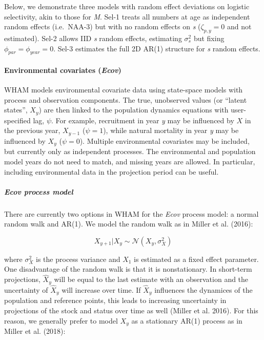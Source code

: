 \documentclass[]{article}
\let\oldparagraph\paragraph
\renewcommand{\paragraph}[1]{\oldparagraph{#1}\mbox{}}
\let\oldsubparagraph\subparagraph
\renewcommand{\subparagraph}[1]{\oldsubparagraph{#1}\mbox{}}
\begin{document}
Below, we demonstrate three models with random effect deviations on
logistic selectivity, akin to those for \emph{M}. Sel-1 treats all
numbers at age as independent random effects (i.e.~NAA-3) but with no
random effects on \emph{s} (\(\zeta_{p,y} = 0\) and not estimated).
Sel-2 allows IID \emph{s} random effects, estimating \(\sigma^2_s\) but
fixing \(\phi_{par} = \phi_{year} = 0\). Sel-3 estimates the full 2D
AR(1) structure for \emph{s} random effects.

\hypertarget{environmental-covariates-ecov}{%
\paragraph{\texorpdfstring{Environmental covariates
(\emph{Ecov})}{Environmental covariates (Ecov)}}\label{environmental-covariates-ecov}}

WHAM models environmental covariate data using state-space models with
process and observation components. The true, unobserved values (or
``latent states'', \(X_y\)) are then linked to the population dynamics
equations with user-specified lag, \(\psi\). For example, recruitment in
year \emph{y} may be influenced by \(X\) in the previous year,
\(X_{y-1}\) (\(\psi = 1\)), while natural mortality in year \emph{y} may
be influenced by \(X_y\) (\(\psi = 0\)). Multiple environmental
covariates may be included, but currently only as independent processes.
The environmental and population model years do not need to match, and
missing years are allowed. In particular, including environmental data
in the projection period can be useful.

\hypertarget{ecov-process-model}{%
\subparagraph{\texorpdfstring{\emph{Ecov} process
model}{Ecov process model}}\label{ecov-process-model}}

There are currently two options in WHAM for the \emph{Ecov} process
model: a normal random walk and AR(1). We model the random walk as in
Miller et al. (2016):

\[X_{y+1} | X_y \sim \mathcal{N}\left( X_y, \sigma^2_X\right)\]

where \(\sigma^2_X\) is the process variance and \(X_1\) is estimated as
a fixed effect parameter. One disadvantage of the random walk is that it
is nonstationary. In short-term projections, \(\hat{X}_y\) will be equal
to the last estimate with an observation and the uncertainty of
\(\hat{X}_y\) will increase over time. If \(\hat{X}_y\) influences the
dynamices of the population and reference points, this leads to
increasing uncertainty in projections of the stock and status over time
as well (Miller et al. 2016). For this reason, we generally prefer to
model \(X_y\) as a stationary AR(1) process as in Miller et al. (2018):
\end{document}
